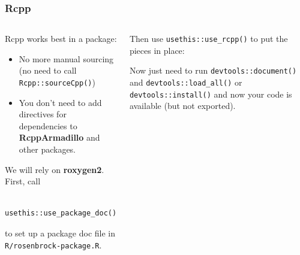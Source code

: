 \documentclass[aspectratio=1610,onlytextwidth]{beamer}
\begin{document}
\begin{frame}[c,fragile]
  \frametitle{Rcpp}

  \begin{columns}[T]
    \begin{column}{0.48\textwidth}

      Rcpp works best in a package:
      \begin{itemize}
        \item No more manual sourcing (no need to call \lstinline{Rcpp::sourceCpp()})
        \item You don't need to add directives for dependencies to \textbf{RcppArmadillo} and other
              packages.
      \end{itemize}

      \pause\medskip

      We will rely on \textbf{roxygen2}. First, call
      \begin{lstlisting}
        usethis::use_package_doc()
      \end{lstlisting}
      to set up a package doc file in \texttt{R/rosenbrock-package.R}.
    \end{column}

    \pause

    \begin{column}{0.42\textwidth}
      Then use \lstinline{usethis::use_rcpp()} to put the pieces in place:

      \medskip


      \medskip\pause

      Now just need to run \texttt{devtools::document()} and
      \lstinline{devtools::load_all()} or \lstinline{devtools::install()}
      and now your code is available (but not exported).
    \end{column}
  \end{columns}

\end{frame}
\end{document}
